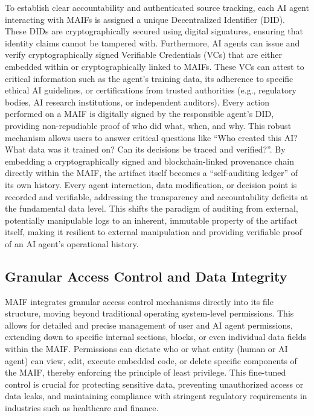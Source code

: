 \documentclass[conference]{IEEEtran}
\begin{document}
To establish clear accountability and authenticated source tracking, each AI agent interacting with MAIFs is assigned a unique Decentralized Identifier (DID)\cite{ref4}. These DIDs are cryptographically secured using digital signatures, ensuring that identity claims cannot be tampered with\cite{ref4}. Furthermore, AI agents can issue and verify cryptographically signed Verifiable Credentials (VCs) that are either embedded within or cryptographically linked to MAIFs. These VCs can attest to critical information such as the agent's training data, its adherence to specific ethical AI guidelines, or certifications from trusted authorities (e.g., regulatory bodies, AI research institutions, or independent auditors)\cite{ref4}. Every action performed on a MAIF is digitally signed by the responsible agent's DID, providing non-repudiable proof of who did what, when, and why. This robust mechanism allows users to answer critical questions like ``Who created this AI? What data was it trained on? Can its decisions be traced and verified?''\cite{ref4}. By embedding a cryptographically signed and blockchain-linked provenance chain directly within the MAIF, the artifact itself becomes a ``self-auditing ledger'' of its own history. Every agent interaction, data modification, or decision point is recorded and verifiable, addressing the transparency and accountability deficits at the fundamental data level. This shifts the paradigm of auditing from external, potentially manipulable logs to an inherent, immutable property of the artifact itself, making it resilient to external manipulation and providing verifiable proof of an AI agent's operational history.

\subsection{Granular Access Control and Data Integrity}

MAIF integrates granular access control mechanisms directly into its file structure, moving beyond traditional operating system-level permissions. This allows for detailed and precise management of user and AI agent permissions, extending down to specific internal sections, blocks, or even individual data fields within the MAIF\cite{ref69}. Permissions can dictate who or what entity (human or AI agent) can view, edit, execute embedded code, or delete specific components of the MAIF, thereby enforcing the principle of least privilege\cite{ref70}. This fine-tuned control is crucial for protecting sensitive data, preventing unauthorized access or data leaks, and maintaining compliance with stringent regulatory requirements in industries such as healthcare and finance\cite{ref69}.
\end{document}
